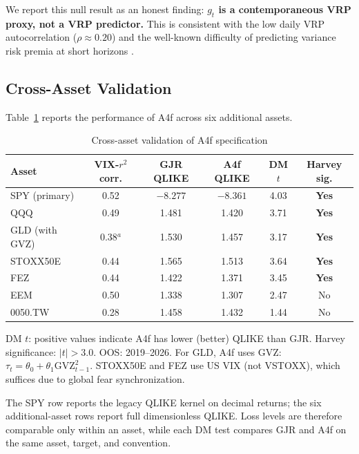\documentclass[12pt,a4paper]{article}
\begin{document}
We report this null result as an honest finding: \textbf{$g_t$ is a contemporaneous VRP proxy, not a VRP predictor.} This is consistent with the low daily VRP autocorrelation ($\rho \approx 0.20$) and the well-known difficulty of predicting variance risk premia at short horizons \citep{bollerslev2009}.


\subsection{Cross-Asset Validation}
\label{sec:cross_asset}

Table~\ref{tab:cross_asset} reports the performance of A4f across six additional assets.

\begin{table}[H]
\centering
\caption{Cross-asset validation of A4f specification}
\label{tab:cross_asset}
\begin{threeparttable}
\begin{tabular}{@{}lccccc@{}}
\toprule
Asset & VIX-$r^2$ corr. & GJR QLIKE & A4f QLIKE & DM $t$ & Harvey sig. \\
\midrule
SPY (primary) & 0.52 & $-8.277$ & $-8.361$ & 4.03 & \textbf{Yes} \\
QQQ & 0.49 & 1.481 & 1.420 & 3.71 & \textbf{Yes} \\
GLD (with GVZ) & 0.38$^a$ & 1.530 & 1.457 & 3.17 & \textbf{Yes} \\
STOXX50E & 0.44 & 1.565 & 1.513 & 3.64 & \textbf{Yes} \\
FEZ & 0.44 & 1.422 & 1.371 & 3.45 & \textbf{Yes} \\
EEM & 0.50 & 1.338 & 1.307 & 2.47 & No \\
0050.TW & 0.28 & 1.458 & 1.432 & 1.44 & No \\ %
\bottomrule
\end{tabular}
\begin{tablenotes}
\footnotesize
\item DM $t$: positive values indicate A4f has lower (better) QLIKE than GJR. Harvey significance: $|t| > 3.0$. OOS: 2019--2026. For GLD, A4f uses GVZ: $\tau_t = \theta_0 + \theta_1 \mathrm{GVZ}_{t-1}^2$. STOXX50E and FEZ use US VIX (not VSTOXX), which suffices due to global fear synchronization.
\item The SPY row reports the legacy QLIKE kernel on decimal returns; the six additional-asset rows report full dimensionless QLIKE. Loss levels are therefore comparable only within an asset, while each DM test compares GJR and A4f on the same asset, target, and convention.

\end{tablenotes}
\end{threeparttable}
\end{table}
\end{document}
